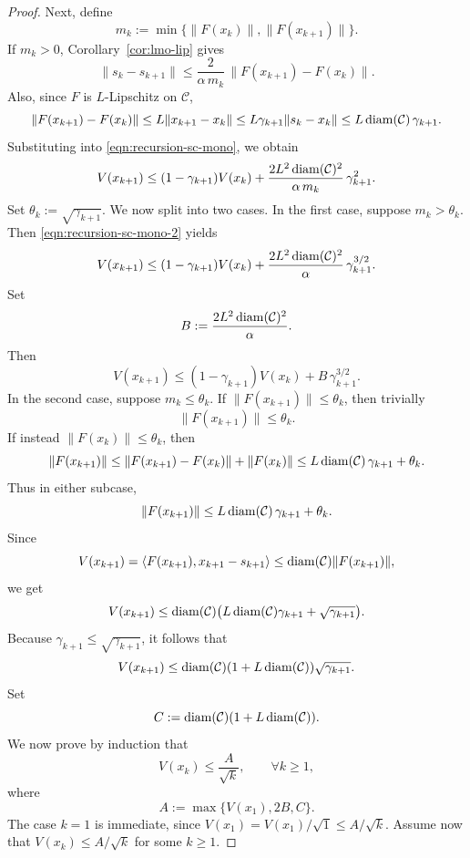 \documentclass[pdflatex,sn-mathphys-num]{sn-jnl}%
\newcommand\diam{\mathop{\rm diam}}
\newcommand\C{\mathcal{C}}
\theoremstyle{thmstyleone}%
\theoremstyle{thmstyletwo}%
\theoremstyle{thmstylethree}%
\begin{document}
\begin{proof}
  Next, define
  \[
    m_k := \min\{\|F(x_k)\|,\|F(x_{k+1})\|\}.
  \]
  If $m_k>0$, Corollary~\ref{cor:lmo-lip} gives
  \[
    \|s_k-s_{k+1}\| \leq \frac{2}{\alpha\,m_k}\,\|F(x_{k+1}) - F(x_k)\|.
  \]
  Also, since $F$ is $L$-Lipschitz on $\C$,
  \[
    \|F(x_{k+1}) - F(x_k)\| \leq L\|x_{k+1}-x_k\| \leq L\gamma_{k+1}\|s_k-x_k\| \leq L\diam(\C)\,\gamma_{k+1}.
  \]
  Substituting into \eqref{eqn:recursion-sc-mono}, we obtain
  \begin{equation}\label{eqn:recursion-sc-mono-2}
    V(x_{k+1}) \leq (1-\gamma_{k+1})V(x_k) + \frac{2L^2\diam(\C)^2}{\alpha\,m_k}\,\gamma_{k+1}^2.
  \end{equation}
  Set $\theta_k := \sqrt{\gamma_{k+1}}$.
  We now split into two cases. In the first case, suppose $m_k > \theta_k$.
  Then \eqref{eqn:recursion-sc-mono-2} yields
  \[
    V(x_{k+1}) \leq (1-\gamma_{k+1})V(x_k) + \frac{2L^2\diam(\C)^2}{\alpha}\,\gamma_{k+1}^{3/2}.
  \]
  Set
  \[
    B := \frac{2L^2\diam(\C)^2}{\alpha}.
  \]
  Then
  \begin{equation}\label{eq:case1-recursion}
    V(x_{k+1}) \leq (1-\gamma_{k+1})V(x_k) + B\,\gamma_{k+1}^{3/2}.
  \end{equation}
  In the second case, suppose $m_k\leq \theta_k$. If $\|F(x_{k+1})\|\leq \theta_k$, then trivially
  \[
    \|F(x_{k+1})\|\leq \theta_k.
  \]
  If instead $\|F(x_k)\|\leq \theta_k$, then
  \[
    \|F(x_{k+1})\| \leq \|F(x_{k+1})-F(x_k)\| + \|F(x_k)\| \leq L\diam(\C)\,\gamma_{k+1}+\theta_k.
  \]
  Thus in either subcase,
  \[
    \|F(x_{k+1})\| \leq L\diam(\C)\,\gamma_{k+1}+\theta_k.
  \]
  Since
  \[
    V(x_{k+1}) = \langle F(x_{k+1}), x_{k+1} - s_{k+1}\rangle \leq \diam(\C)\|F(x_{k+1})\|,
  \]
  we get
  \[
    V(x_{k+1}) \leq \diam(\C)\big(L\diam(\C)\gamma_{k+1} + \sqrt{\gamma_{k+1}}\big).
  \]
  Because $\gamma_{k+1}\leq \sqrt{\gamma_{k+1}}$, it follows that
  \begin{equation}\label{eq:case2-recursion}
    V(x_{k+1}) \leq \diam(\C)(1 + L\diam(\C))\sqrt{\gamma_{k+1}}.
  \end{equation}
  Set
  \[
    C := \diam(\C)(1 + L\diam(\C)).
  \]
  We now prove by induction that
  \[
    V(x_k) \leq \frac{A}{\sqrt{k}},
    \qquad \forall k\geq 1,
  \]
  where
  \[
    A := \max\{V(x_1),2B,C\}.
  \]
  The case $k=1$ is immediate, since $V(x_1) = V(x_1)/\sqrt{1} \leq A/\sqrt{k}$.
  Assume now that $V(x_k) \leq A/\sqrt{k}$ for some $k\geq 1$.


\end{proof}
\end{document}
